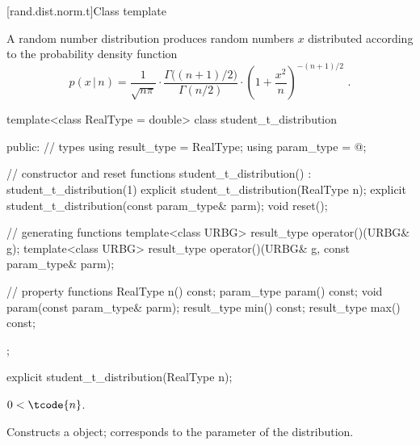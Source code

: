 
[rand.dist.norm.t]{Class template }%
%
%

\pnum
A  random number distribution
produces random numbers $x$
distributed according to
the probability density function%
%
%
\[ p(x\,|\,n) = \frac{1}{\sqrt{n \pi}}
     \cdot \frac{\Gamma\big((n+1)/2\big)}{\Gamma(n/2)}
     \cdot \left(1 + \frac{x^2}{n} \right)^{-(n+1)/2}
     \text{ .} \]

%
\begin{codeblock}
template<class RealType = double>
  class student_t_distribution {
  public:
    // types
    using result_type = RealType;
    using param_type  = @\unspec@;

    // constructor and reset functions
    student_t_distribution() : student_t_distribution(1) {}
    explicit student_t_distribution(RealType n);
    explicit student_t_distribution(const param_type& parm);
    void reset();

    // generating functions
    template<class URBG>
      result_type operator()(URBG& g);
    template<class URBG>
      result_type operator()(URBG& g, const param_type& parm);

    // property functions
    RealType n() const;
    param_type param() const;
    void param(const param_type& parm);
    result_type min() const;
    result_type max() const;
  };
\end{codeblock}


%
\begin{itemdecl}
explicit student_t_distribution(RealType n);
\end{itemdecl}

\begin{itemdescr}
\pnum
\requires $0 < \tcode{n}$.

\pnum
\effects Constructs a  object;
 corresponds to the parameter of the distribution.
\end{itemdescr}

